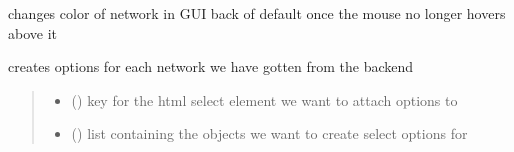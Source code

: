 \documentclass[letterpaper,10pt,english]{sphinxmanual}
\begin{document}

\begin{fulllineitems}
\label{\detokenize{docs_gui/js_api/postcode_editor/display_postcode:styleWhenMouseOut}}
\pysigstartsignatures
{}
\pysigstopsignatures
\sphinxAtStartPar
changes color of network in GUI back of default once the mouse no longer hovers above it

\end{fulllineitems}


\begin{fulllineitems}
\label{\detokenize{docs_gui/js_api/postcode_editor/display_postcode:populateNetList}}
\pysigstartsignatures
{}
\pysigstopsignatures
\sphinxAtStartPar
creates options for each network we have gotten from the backend
\begin{quote}\begin{description}
\begin{itemize}
\item {} 
\sphinxAtStartPar
{} () \textendash{} key for the html select element we want to attach options to

\item {} 
\sphinxAtStartPar
{} () \textendash{} list containing the objects we want to create select options for

\end{itemize}

\end{description}\end{quote}

\end{fulllineitems}

\end{document}
